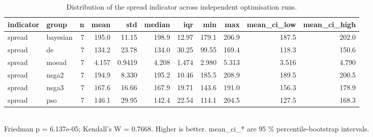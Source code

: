 \begin{table}[!t]
\centering
\caption{Distribution of the spread indicator across independent optimisation runs.}
\label{tab:statistics_optimizer_spread_main}
\footnotesize
\begin{tabular}{llrrrrrrrrr}
\toprule
indicator & group & n & mean & std & median & iqr & min & max & mean\_ci\_low & mean\_ci\_high \\
\midrule
spread & bayesian & 7 & 195.0 & 11.15 & 198.9 & 12.97 & 179.1 & 206.9 & 187.5 & 202.0 \\
spread & de & 7 & 134.2 & 23.78 & 134.0 & 30.25 & 99.55 & 169.4 & 118.3 & 150.6 \\
spread & moead & 7 & 4.157 & 0.9419 & 4.208 & 1.474 & 2.980 & 5.313 & 3.516 & 4.790 \\
spread & nsga2 & 7 & 194.9 & 8.330 & 195.2 & 10.46 & 185.5 & 208.9 & 189.5 & 200.5 \\
spread & nsga3 & 7 & 167.6 & 16.66 & 167.9 & 19.71 & 143.6 & 191.0 & 156.3 & 178.9 \\
spread & pso & 7 & 146.1 & 29.95 & 142.4 & 22.54 & 114.1 & 204.5 & 127.5 & 168.3 \\
\bottomrule
\end{tabular}
\\[2pt] \footnotesize Friedman p = 6.137e-05; Kendall's W = 0.7668. Higher is better. mean\_ci\_* are 95 \% percentile-bootstrap intervals.
\end{table}
